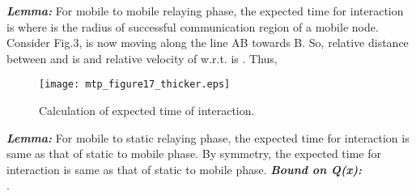 \documentclass[conference]{IEEEtran}
\begin{document}
\emph{\bf Lemma:} For mobile to mobile relaying phase, the expected time for interaction is  where  is the radius of successful communication region of a mobile node.
Consider Fig.3,  is now moving along the line AB towards B. So, relative distance between  and  is  and relative 
velocity of  w.r.t.  is . Thus, \\
\begin{figure}[ht] \centering \label{con} \texttt{[image: mtp\_figure17\_thicker.eps]}\\
\caption{Calculation of expected time of interaction.} 
\vspace{0.05in}
\end{figure}
\emph{\bf Lemma:} For mobile to static relaying phase, the expected time for interaction is same as that of static to mobile phase.
By symmetry, the expected time for interaction is same as that of static to mobile phase.\quad\quad\quad\quad\quad\quad\quad\quad\quad
\emph{\bf Bound on Q(x):}\\\quad\quad[10].
\end{document}
